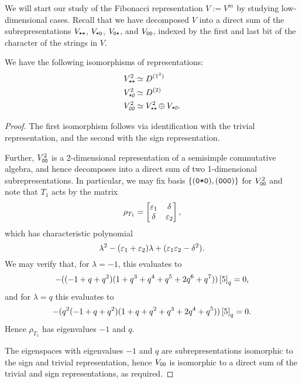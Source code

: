 \documentclass{amsart}
\begin{document}
We will start our study of the Fibonacci representation $V := V^m$ by studying low-dimensional cases.
Recall that we have decomposed $V$ into a direct sum of the subrepresentations $V_{\texttt{*}\texttt{*}}$, $V_{\texttt{*}\texttt{0}}$, $V_{\texttt{0}\texttt{*}}$, and $V_{\texttt{0}\texttt{0}}$, indexed by the first and last bit of the character of the strings in $V$.
\begin{proposition}
  We have the following isomorphisms of representations:
  \begin {align*}
    \emph{$V_{\texttt{*}\texttt{*}}^2$} &\simeq D^{(1^2)}\\
    \emph{$V_{\texttt{*}\texttt{0}}^2$} &\simeq D^{(2)}\\
    \emph{$V_{\texttt{0}\texttt{0}}^2$} &\simeq \emph{$V_{\texttt{*}\texttt{*}}^2 \oplus V_{\texttt{*}\texttt{0}}$}.
  \end{align*}
\end{proposition}
\begin{proof}
  The first isomorphism follows via identification with the trivial representation, and the second with the sign representation.

  Further, $V_{\texttt{0}\texttt{0}}^2$ is a 2-dimensional representation of a semisimple commutative algebra, and hence decomposes into a direct sum of two 1-dimensional subrepresentations.
  In particular, we may fix basis $\left\{ (\texttt{0}\texttt{*}\texttt{0}),(\texttt{0}\texttt{0}\texttt{0}) \right\}$ for $V_{\texttt{0}\texttt{0}}^2$ and note that $T_1$ acts by the matrix
  \[
    \rho_{T_1} = \begin{bmatrix}
      \varepsilon_1 & \delta\\
      \delta & \varepsilon_2
    \end{bmatrix},
  \]
  which has characteristic polynomial \[\lambda^2 - (\varepsilon_1 + \varepsilon_2)\lambda +(\varepsilon_1\varepsilon_2 - \delta^2).\]
  We may verify that, for $\lambda = -1$, this evaluates to
  \[
    -((-1 + q + q^2) (1 + q^3 + q^4 + q^5 + 2 q^6 + q^7))\left[ 5 \right]_q = 0,
  \]
  and for $\lambda = q$ this evaluates to 
  \[
  -(q^2 (-1 + q + q^2) (1 + q + q^2 + q^3 + 2 q^4 + q^5)) \left[ 5 \right]_q = 0.
  \]
  Hence $\rho_{T_1}$ has eigenvalues $-1$ and $q$.

  The eigenspaces with eigenvalues $-1$ and $q$ are subrepresentations isomorphic to the sign and trivial representation, hence $V_{\texttt{0}\texttt{0}}$ is isomorphic to a direct sum of the trivial and sign representations, as required.
\end{proof}
\end{document}
